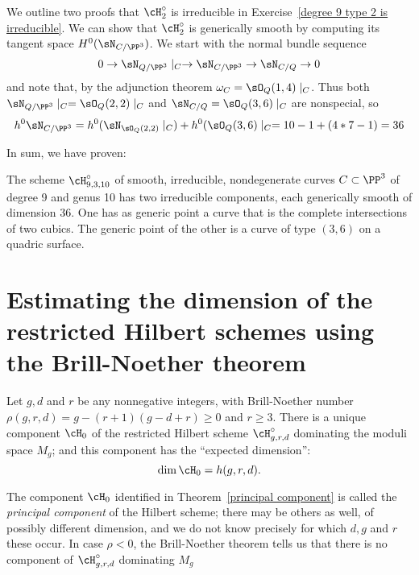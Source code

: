 We outline two proofs that 
$\cH^\circ_2$ is irreducible in Exercise~\ref{degree 9 type 2 is irreducible}.
We can show that $\cH^\circ_2$ is generically smooth by computing its tangent space
$H^0(\sN_{C/\PP^3})$. We start with the normal bundle sequence
$$
0\to \sN_{Q/\PP^3}\mid_C \to \sN_{C/\PP^3} \to \sN_{C/Q} \to 0
$$
and note that, by the adjunction theorem $\omega_C = \sO_Q(1,4)\mid_C$.
Thus both $\sN_{Q/\PP^3}\mid_C = \sO_Q(2,2)\mid_C$ and
$\sN_{C/Q} = \sO_Q(3,6)\mid_C$ are nonspecial, so 
$$
h^0 \sN_{C/\PP^3} = h^0(\sN_{\sO_Q(2,2)}\mid_C ) + h^0(\sO_Q(3,6)\mid_C
= 10-1 + (4*7-1) = 36
$$

In sum, we have proven:
\begin{proposition}
 The scheme $\cH^\circ_{9,3,10}$ of smooth, irreducible, nondegenerate curves $C \subset \PP^3$ of degree 9 and genus 10 has two irreducible components, each generically smooth of dimension 36. One has as generic point a curve that is the complete intersections of two cubics. The generic point of the other is a curve of type $(3,6)$ on a quadric surface. \end{proposition}







\section{Estimating the dimension of the restricted Hilbert schemes using the Brill-Noether theorem}\label{estimating dim hilb}

\begin{theorem}\label{principal component}
Let $g, d$ and $r$ be any nonnegative integers, with Brill-Noether number  $\rho(g,r,d) = g - (r+1)(g-d+r) \geq 0$
and $r\geq 3$.  There is a unique component $\cH_0$ of the restricted Hilbert scheme $\cH^\circ_{g,r,d}$ dominating the moduli space $M_g$; and this component has the ``expected dimension'':
$$
\dim \cH_0 = h(g,r,d).
$$
\end{theorem}

 The component $\cH_0$ identified in Theorem~\ref{principal component} is called the \emph{principal component} of the Hilbert scheme; there may be others as well, of possibly different dimension, and we do not know precisely for which $d,g$ and $r$ these occur. In case $\rho < 0$, the Brill-Noether theorem tells us that there is no component of $\cH^\circ_{g,r,d}$ dominating $M_g$


